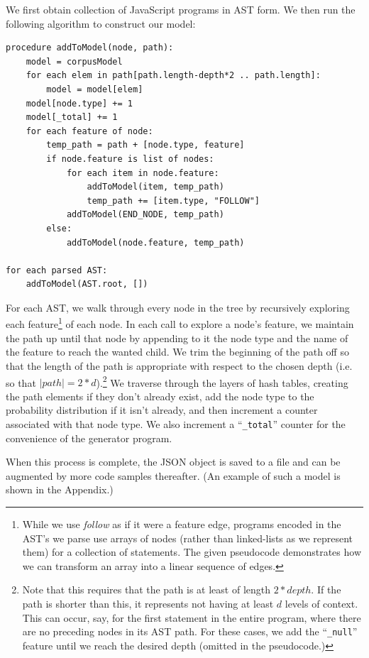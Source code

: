 \documentclass{article}
\begin{document}
We first obtain collection of JavaScript programs in AST form. We then run the following algorithm to construct our model:

\begin{verbatim}
procedure addToModel(node, path):
    model = corpusModel
    for each elem in path[path.length-depth*2 .. path.length]:
        model = model[elem]
    model[node.type] += 1
    model[_total] += 1
    for each feature of node:
        temp_path = path + [node.type, feature]
        if node.feature is list of nodes:
            for each item in node.feature:
                addToModel(item, temp_path)
                temp_path += [item.type, "FOLLOW"]
            addToModel(END_NODE, temp_path)
        else:
            addToModel(node.feature, temp_path)

for each parsed AST:
    addToModel(AST.root, [])
\end{verbatim}

For each AST, we walk through every node in the tree by recursively exploring each feature\footnote{While we use \emph{follow} as if it were a feature edge, programs encoded in the AST's we parse use arrays of nodes (rather than linked-lists as we represent them) for a collection of statements. The given pseudocode demonstrates how we can transform an array into a linear sequence of edges.} of each node. In each call to explore a node's feature, we maintain the path up until that node by appending to it the node type and the name of the feature to reach the wanted child. We trim the beginning of the path off so that the length of the path is appropriate with respect to the chosen depth (i.e. so that $|path| = 2*d$).\footnote{Note that this requires that the path is at least of length $2*depth$. If the path is shorter than this, it represents not having at least $d$ levels of context. This can occur, say, for the first statement in the entire program, where there are no preceding nodes in its AST path. For these cases, we add the ``{\tt \_null}'' feature until we reach the desired depth (omitted in the pseudocode.)} We traverse through the layers of hash tables, creating the path elements if they don't already exist, add the node type to the probability distribution if it isn't already, and then increment a counter associated with that node type. We also increment a ``{\tt \_total}'' counter for the convenience of the generator program.

When this process is complete, the JSON object is saved to a file and can be augmented by more code samples thereafter. (An example of such a model is shown in the Appendix.)
\end{document}
